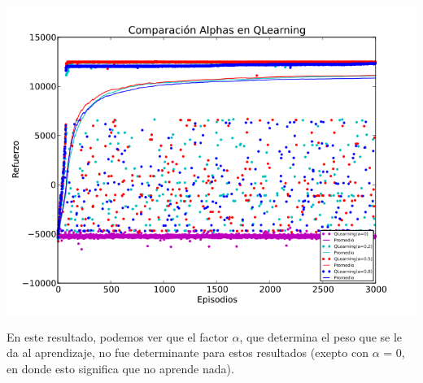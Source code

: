 \documentclass[11pt, a4paper]{article}
\begin{document}
\includegraphics[scale=0.6]{Graf3}

En este resultado, podemos ver que el factor $\alpha$, que determina el peso que se le da al aprendizaje, no fue determinante para estos resultados (exepto con $\alpha$ = 0, en donde esto significa que no aprende nada).
\end{document}
